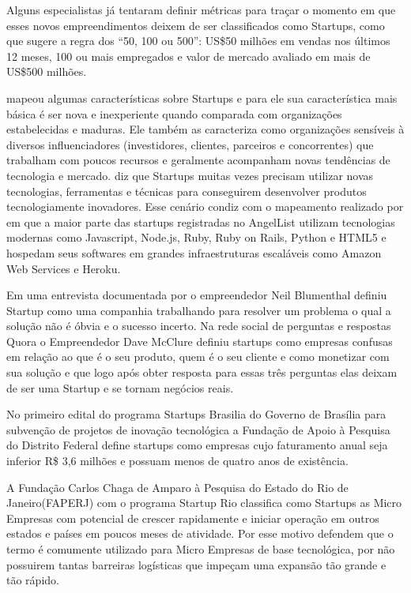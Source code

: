 Alguns especialistas já tentaram definir métricas para traçar o momento em que esses novos empreendimentos deixem de ser classificados como Startups, como  que sugere a regra dos ``50, 100 ou 500'': US\$50 milhões em vendas nos últimos 12 meses, 100 ou mais empregados e valor de mercado avaliado em mais de US\$500 milhões.   

 mapeou algumas características sobre Startups e para ele sua característica mais básica é ser nova e inexperiente quando comparada com organizações estabelecidas e maduras. Ele também as caracteriza como organizações sensíveis à diversos influenciadores (investidores, clientes, parceiros e concorrentes) que trabalham com poucos recursos e geralmente acompanham novas tendências de tecnologia e mercado.  diz que Startups muitas vezes precisam utilizar novas tecnologias, ferramentas e técnicas para conseguirem desenvolver produtos tecnologiamente inovadores. Esse cenário condiz com o mapeamento realizado por  em que a maior parte das startups registradas no AngelList utilizam tecnologias modernas como Javascript, Node.js, Ruby, Ruby on Rails, Python e HTML5 e hospedam seus softwares em grandes infraestruturas escaláveis como Amazon Web Services e Heroku.

Em uma entrevista documentada por  o empreendedor Neil Blumenthal definiu Startup como uma companhia trabalhando para resolver um problema o qual a solução não é óbvia e o sucesso incerto. Na rede social de perguntas e respostas Quora o Empreendedor Dave McClure definiu startups como empresas confusas em relação ao que é o seu produto, quem é o seu cliente e como monetizar com sua solução e que logo após obter resposta para essas três perguntas elas deixam de ser uma Startup e se tornam negócios reais.

No primeiro edital do programa Startups Brasilia do Governo de Brasília para subvenção de projetos de inovação tecnológica a Fundação de Apoio à Pesquisa do Distrito Federal define startups como empresas cujo faturamento anual seja inferior R\$ 3,6 milhões e possuam menos de quatro anos de existência. 

A Fundação Carlos Chaga de Amparo à Pesquisa do Estado do Rio de Janeiro(FAPERJ) com o programa Startup Rio classifica como Startups as Micro Empresas com potencial de crescer rapidamente e iniciar operação em outros estados e países em poucos meses de atividade. Por esse motivo defendem que o termo é comumente utilizado para Micro Empresas de base tecnológica, por não possuirem tantas barreiras logísticas que impeçam uma expansão tão grande e tão rápido.

